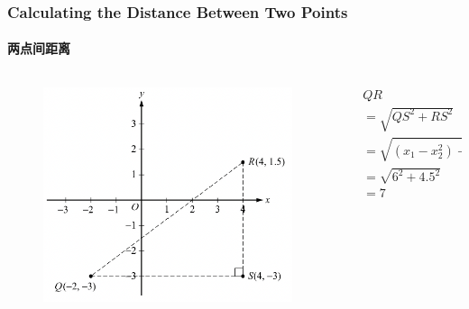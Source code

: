 \documentclass[
	11pt, %
	handout,
]{beamer}
\begin{document}
\begin{frame}
	\frametitle{Calculating the Distance Between Two Points}
	\framesubtitle{两点间距离}
	\begin{columns}[t] 
		\begin{column}{0.6\textwidth} %
			\begin{figure}
		    \includegraphics[width=\linewidth]{Distance_Between _Two_Points.png}
		 \end{figure}
		\end{column}
		\begin{column}{0.4 \textwidth} %
			\begin{equation*}
				\begin{aligned}
				&QR\\
				&= \sqrt{QS^2 + RS^2}\\
				&= \sqrt{(x_1 - x_2^2) + (y_1 + y_2)^2}\\
				&= \sqrt{6^2 + 4.5^2}\\
				&= 7\\
				\end{aligned}
			\end{equation*}

    \end{column}
	\end{columns}
\end{frame}



\end{document}
